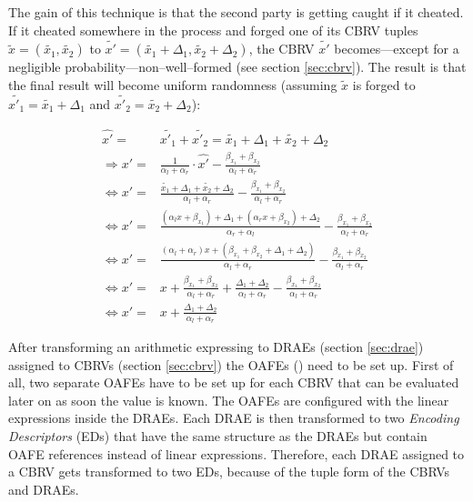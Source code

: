 The gain of this technique is that the second party is getting caught if it
cheated. If it cheated somewhere in the process and forged one of its CBRV
tuples $\widetilde{x} = (\widetilde{x_1}, \widetilde{x_2})$ to $\widetilde{x'} =
(\widetilde{x_1} + \Delta_1, \widetilde{x_2} + \Delta_2)$, the CBRV
$\widetilde{x'}$ becomes---except for a negligible
probability---non--well--formed (see section \ref{sec:cbrv}). The result is that
the final result will become uniform randomness (assuming $\widetilde{x}$ is
forged to $\widetilde{x'_1} = \widetilde{x_1} + \Delta_1$ and $\widetilde{x'_2}
= \widetilde{x_2} + \Delta_2$):

\begin{align*}
  \widehat{x'} = & \widetilde{x'_1} + \widetilde{x'_2} = \widetilde{x_1} +
  \Delta_1 + \widetilde{x_2} + \Delta_2 \\
  \Rightarrow x' = & \frac{1}{\alpha_l + \alpha_r} \cdot \widehat{x'} -
  \frac{\beta_{x_1} +
  \beta_{x_2}}{\alpha_l + \alpha_r} \\
  \Leftrightarrow x' = & \frac{\widetilde{x_1} + \Delta_1 +
  \widetilde{x_2} + \Delta_2}{\alpha_l + \alpha_r} -
  \frac{\beta_{x_1} +\beta_{x_2}}{\alpha_l + \alpha_r}\\
  \Leftrightarrow x' = & \frac{(\alpha_l x + \beta_{x_1}) + \Delta_1 +
  (\alpha_r x + \beta_{x_2}) + \Delta_2}{\alpha_r + \alpha_l} -
  \frac{\beta_{x_1} +\beta_{x_2}}{\alpha_l + \alpha_r} \\
  \Leftrightarrow x' = & \frac{(\alpha_l+\alpha_r)x + (\beta_{x_1}+\beta_{x_2} +
  \Delta_1+\Delta_2)}{\alpha_l+\alpha_r} -
  \frac{\beta_{x_1} +\beta_{x_2}}{\alpha_l + \alpha_r} \\
  \Leftrightarrow x' = & x + \frac{\beta_{x_1}+\beta_{x_2}}{\alpha_l+\alpha_r}
  + \frac{\Delta_1 + \Delta_2}{\alpha_l + \alpha_r} -
  \frac{\beta_{x_1}+\beta_{x_2}}{\alpha_l + \alpha_r} \\
  \Leftrightarrow x' = & x + \frac{\Delta_1 + \Delta_2}{\alpha_l + \alpha_r}
\end{align*}


%
%
\label{sec:prep-eval}

After transforming an arithmetic expressing to DRAEs (section \ref{sec:drae})
assigned to CBRVs (section \ref{sec:cbrv}) the OAFEs (\cite{davidgoliath}) need
to be set up. First of all, two separate OAFEs have to be set up for each CBRV
that can be evaluated later on as soon the value is known. The OAFEs are
configured with the linear expressions inside the DRAEs. Each DRAE is then
transformed to two \emph{Encoding Descriptors} (EDs) that have the same
structure as the DRAEs but contain OAFE references instead of linear
expressions. Therefore, each DRAE assigned to a CBRV gets transformed to two
EDs, because of the tuple form of the CBRVs and DRAEs.


